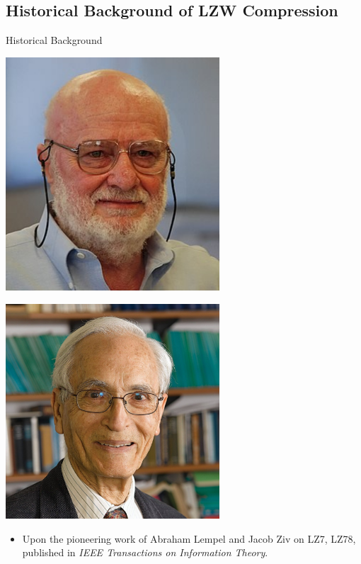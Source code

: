 \documentclass[10pt,handout,english]{beamer}
\begin{document}
\subsection{Historical Background of LZW Compression}

\begin{frame}{Historical Background}
    \begin{minipage}{0.49\textwidth}
        \centering
        \includegraphics[width=0.6\textwidth, height=0.7\textwidth]{pic/lempel.jpg}
    \end{minipage}%
    \hfill
    \begin{minipage}{0.49\textwidth}
        \centering
        \includegraphics[width=0.6\textwidth, height=0.7\textwidth]{pic/Ziv.jpeg}
    \end{minipage}
    
    \begin{itemize} [label=\textcolor{purple}{$\bullet$}]
        \item  Upon the pioneering work of Abraham Lempel and Jacob Ziv on LZ7, LZ78, published in \textit{IEEE Transactions on Information Theory}.
    \end{itemize}
\end{frame}
\end{document}

